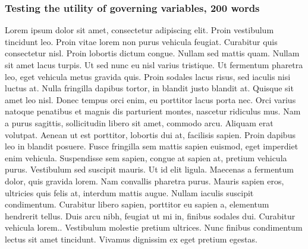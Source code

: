 \documentclass[techmemo]{ecmwfrep}%
\begin{document}
\subsubsection{Testing the utility of governing variables, 200 words}
Lorem ipsum dolor sit amet, consectetur adipiscing elit. Proin vestibulum tincidunt leo. Proin vitae lorem non purus vehicula feugiat. Curabitur quis consectetur nisl. Proin lobortis dictum congue. Nullam sed mattis quam. Nullam sit amet lacus turpis. Ut sed nunc eu nisl varius tristique. Ut fermentum pharetra leo, eget vehicula metus gravida quis. Proin sodales lacus risus, sed iaculis nisi luctus at. Nulla fringilla dapibus tortor, in blandit justo blandit at. Quisque sit amet leo nisl. Donec tempus orci enim, eu porttitor lacus porta nec. Orci varius natoque penatibus et magnis dis parturient montes, nascetur ridiculus mus. Nam a purus sagittis, sollicitudin libero sit amet, commodo arcu. Aliquam erat volutpat. Aenean ut est porttitor, lobortis dui at, facilisis sapien. Proin dapibus leo in blandit posuere. Fusce fringilla sem mattis sapien euismod, eget imperdiet enim vehicula. Suspendisse sem sapien, congue at sapien at, pretium vehicula purus. Vestibulum sed suscipit mauris. Ut id elit ligula. Maecenas a fermentum dolor, quis gravida lorem. Nam convallis pharetra purus. Mauris sapien eros, ultricies quis felis at, interdum mattis augue. Nullam iaculis suscipit condimentum. Curabitur libero sapien, porttitor eu sapien a, elementum hendrerit tellus. Duis arcu nibh, feugiat ut mi in, finibus sodales dui. Curabitur vehicula lorem.. Vestibulum molestie pretium ultrices. Nunc finibus condimentum lectus sit amet tincidunt. Vivamus dignissim ex eget pretium egestas.

\end{document}
